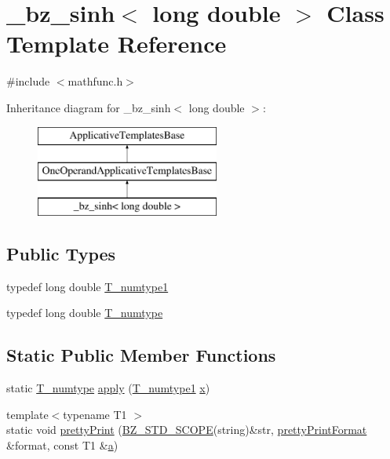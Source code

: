 \hypertarget{class__bz__sinh_3_01long_01double_01_4}{}\section{\+\_\+bz\+\_\+sinh$<$ long double $>$ Class Template Reference}
\label{class__bz__sinh_3_01long_01double_01_4}


{\ttfamily \#include $<$mathfunc.\+h$>$}

Inheritance diagram for \+\_\+bz\+\_\+sinh$<$ long double $>$\+:\begin{figure}[H]
\begin{center}
\leavevmode
\includegraphics[height=3.000000cm]{class__bz__sinh_3_01long_01double_01_4}
\end{center}
\end{figure}
\subsection*{Public Types}
\begin{DoxyCompactItemize}
\item 
typedef long double \hyperlink{class__bz__sinh_3_01long_01double_01_4_a48081c2de4095442d8b68490f715027e}{T\+\_\+numtype1}
\item 
typedef long double \hyperlink{class__bz__sinh_3_01long_01double_01_4_aaf78d2b7b99c9302b2104ae48d866e1c}{T\+\_\+numtype}
\end{DoxyCompactItemize}
\subsection*{Static Public Member Functions}
\begin{DoxyCompactItemize}
\item 
static \hyperlink{class__bz__sinh_3_01long_01double_01_4_aaf78d2b7b99c9302b2104ae48d866e1c}{T\+\_\+numtype} \hyperlink{class__bz__sinh_3_01long_01double_01_4_abfe088f110865938a992dd8d610c99c7}{apply} (\hyperlink{class__bz__sinh_3_01long_01double_01_4_a48081c2de4095442d8b68490f715027e}{T\+\_\+numtype1} \hyperlink{vecnorm1_8cc_ac73eed9e41ec09d58f112f06c2d6cb63}{x})
\item 
{\footnotesize template$<$typename T1 $>$ }\\static void \hyperlink{class__bz__sinh_3_01long_01double_01_4_a4be5e95111e9aa17bab0ce6807066f42}{pretty\+Print} (\hyperlink{numinquire_8h_a2b24ffc3b4ef9803956bc7715c6c7b83}{B\+Z\+\_\+\+S\+T\+D\+\_\+\+S\+C\+O\+P\+E}(string)\&str, \hyperlink{classprettyPrintFormat}{pretty\+Print\+Format} \&format, const T1 \&\hyperlink{gen__mat5files_8m_aae328bf20413f220e38aec4d95bfd6da}{a})
\end{DoxyCompactItemize}


